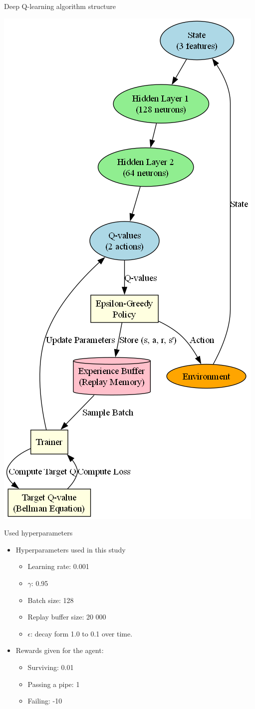 \documentclass[xcolor=dvipsnames]{beamer}
\begin{document}
\begin{frame}{Deep Q-learning algorithm structure}
    \begin{center}
        \vspace{0.05cm} %
        \includegraphics[height=0.65\textwidth]{resources/dqn_architecture_diagram.png}
    \end{center}
\end{frame}


\begin{frame}{Used hyperparameters}
    \begin{itemize}
        \item Hyperparameters used in this study
        \begin{itemize}
            \item Learning rate: 0.001
            \item \(\gamma\): 0.95
            \item Batch size: 128
            \item Replay buffer size: 20 000
            \item \(\epsilon\): decay form 1.0 to 0.1 over time.
        \end{itemize}
        \item Rewards given for the agent:
        \begin{itemize}
            \item Surviving: 0.01
            \item Passing a pipe: 1
            \item Failing: -10
        \end{itemize}
    \end{itemize}
\end{frame}
\end{document}
